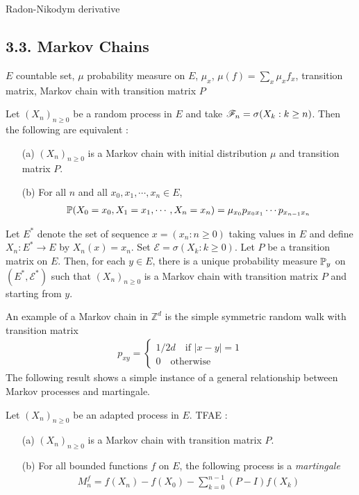 \documentclass[10pt,a4paper]{report}
\begin{document}
Radon-Nikodym derivative
\s

\subsection*{3.3. Markov Chains}

$E$ countable set, $\mu$ probability measure on $E$, $\mu_x$, $\mu(f) = \sum_x \mu_x f_x$, transition matrix, Markov chain with transition matrix $P$
\s

 Let $(X_n)_{n\geq 0}$ be a random process in $E$ and take $\mathscr{F}_n = \sigma (X_k : k\geq n)$. Then the following are equivalent :
\begin{itemize}
\item[(a)] $(X_n)_{n\geq 0}$ is a Markov chain with initial distribution $\mu$ and transition matrix $P$.
\item[(b)] For all $n$ and all $x_0,x_1,\cdots,x_n\in E$,
\begin{align*}
\mathbb{P}(X_0 = x_0, X_1=x_1,\cdots,X_n=x_n) = \mu_{x_0} p_{x_0 x_1} \cdots p_{x_{n-1}x_n}
\end{align*}
\end{itemize}
\s

 Let $E^*$ denote the set of sequence $x=(x_n : n\geq 0)$ taking values in $E$ and define $X_n : E^* \rightarrow E$ by $X_n(x) = x_n$. Set $\mathscr{E} = \sigma (X_k : k\geq 0)$. Let $P$ be a transition matrix on $E$. Then, for each $y\in E$, there is a unique probability measure $\mathbb{P}_y$ on $(E^*,\mathscr{E}^*)$ such that $(X_n)_{n\geq 0}$ is a Markov chain with transition matrix $P$ and starting from $y$.
\s

An example of a Markov chain in $\mathbb{Z}^d$ is the simple symmetric random walk with transition matrix
\begin{align*}
p_{xy} = \begin{cases}
1/2d \quad \text{if } |x-y| =1 \\
0 \quad \text{otherwise}
\end{cases}
\end{align*}
The following result shows a simple instance of a general relationship between Markov processes and martingale.
\s

 Let $(X_n)_{n\geq 0}$ be an adapted process in $E$. TFAE :
\begin{itemize}
\item[(a)] $(X_n)_{n\geq 0}$ is a Markov chain with transition matrix $P$.
\item[(b)] For all bounded functions $f$ on $E$, the following process is a \emph{martingale}
\begin{align*}
M^f_n = f(X_n) - f(X_0) - \sum_{k=0}^{n-1} (P-I) f(X_k)
\end{align*}
\end{itemize}
\s
\end{document}
